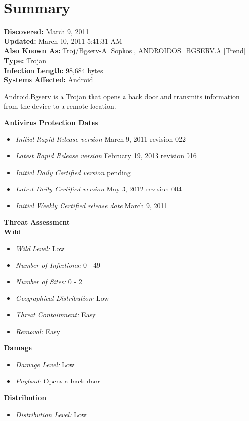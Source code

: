 \section{Summary}

\textbf{Discovered:} March 9, 2011 \\
\textbf{Updated:} March 10, 2011 5:41:31 AM \\
\textbf{Also Known As:} Troj/Bgserv-A [Sophos],	ANDROIDOS\_BGSERV.A [Trend] \\
\textbf{Type:} Trojan \\
\textbf{Infection Length:} 98,684 bytes \\
\textbf{Systems Affected:} Android

Android.Bgserv is a Trojan that opens a back door and transmits information from the device to a remote location. 

\textbf{\large Antivirus Protection Dates}
\begin{itemize}
	\item \textit{Initial Rapid Release version} March 9, 2011 revision 022
	\item \textit{Latest Rapid Release version} February 19, 2013 revision 016
	\item \textit{Initial Daily Certified version} pending
	\item \textit{Latest Daily Certified version} May 3, 2012 revision 004
	\item \textit{Initial Weekly Certified release date} March 9, 2011
\end{itemize}

\textbf{\large Threat Assessment} \\
\textbf{Wild}
\begin{itemize}
	\item \textit{Wild Level:} Low
	\item \textit{Number of Infections:} 0 - 49
	\item \textit{Number of Sites:} 0 - 2
	\item \textit{Geographical Distribution:} Low
	\item \textit{Threat Containment:} Easy
	\item \textit{Removal:} Easy
\end{itemize}
\textbf{Damage}
\begin{itemize}
	\item \textit{Damage Level:} Low
	\item \textit{Payload:} Opens a back door
\end{itemize}
\textbf{Distribution}
\begin{itemize}
	\item \textit{Distribution Level:} Low
\end{itemize}

